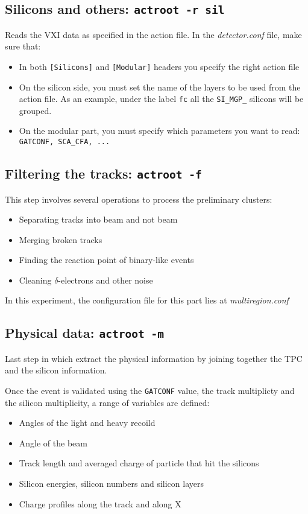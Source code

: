 \documentclass[11pt, a4paper, galician]{article}
\begin{document}
\subsection*{Silicons and others: \lstinline|actroot -r sil|}
Reads the VXI data as specified in the action file. In the \textit{detector.conf} file, make sure that:
\begin{itemize}
    \item In both \lstinline|[Silicons]| and \lstinline|[Modular]| headers you specify the right action file
    \item On the silicon side, you must set the name of the layers to be used from the action file. As an example, under the label \lstinline|fc| all the \lstinline|SI_MGP_| silicons will be grouped.
    \item On the modular part, you must specify which parameters you want to read: \lstinline|GATCONF, SCA_CFA, ...|
\end{itemize}
\subsection*{Filtering the tracks: \lstinline|actroot -f|}
This step involves several operations to process the preliminary clusters:
\begin{itemize}
    \item Separating tracks into beam and not beam
    \item Merging broken tracks 
    \item Finding the reaction point of binary-like events
    \item Cleaning $\delta$-electrons and other noise
\end{itemize}
In this experiment, the configuration file for this part lies at \textit{multiregion.conf}
\subsection*{Physical data: \lstinline|actroot -m|}
Last step in which extract the physical information by joining together the TPC and the silicon information.

Once the event is validated using the \lstinline|GATCONF| value, the track multiplicty and the silicon multiplicity, a range of variables are defined:
\begin{itemize}
    \item Angles of the light and heavy recoild
    \item Angle of the beam
    \item Track length and averaged charge of particle that hit the silicons
    \item Silicon energies, silicon numbers and silicon layers
    \item Charge profiles along the track and along X
\end{itemize}
\end{document}
